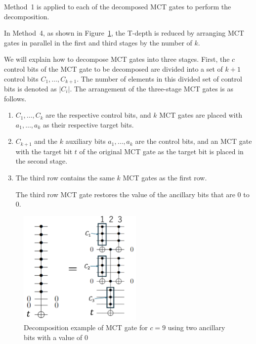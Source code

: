 Method~1 is applied to each of the decomposed MCT gates to perform the decomposition.

In Method~4, as shown in Figure~\ref{niemann},
the T-depth is reduced by arranging MCT gates in parallel in the first and third stages by the number of $k$.

\par
We will explain how to decompose MCT gates into three stages.
First, the $c$ control bits of the MCT gate to be decomposed are divided into a set of $k+1$ control bits $C_{1},\dots,C_{k+1}$.
The number of elements in this divided set of control bits is denoted as $|C_{i}|$.
The arrangement of the three-stage MCT gates is as follows.
\begin{enumerate}
\item $C_{1},\dots,C_{k}$ are the respective control bits, and $k$ MCT gates are placed with $a_{1},\dots,a_{k}$ as their respective target bits.
\item $C_{k+1}$ and the $k$ auxiliary bits $a_{1},\dots,a_{k}$ are the control bits, and an MCT gate with the target bit $t$ of the original MCT gate as the target bit is placed in the second stage.
\item The third row contains the same $k$ MCT gates as the first row.

The third row MCT gate restores the value of the ancillary bits that are 0 to 0.

\end{enumerate}
\begin{figure}[tbp]

\centering

\includegraphics[width=6cm]{img/niemann.pdf}

\caption{Decomposition example of MCT gate for $c=9$ using two ancillary bits with a value of 0}

\label{niemann}

\end{figure}


